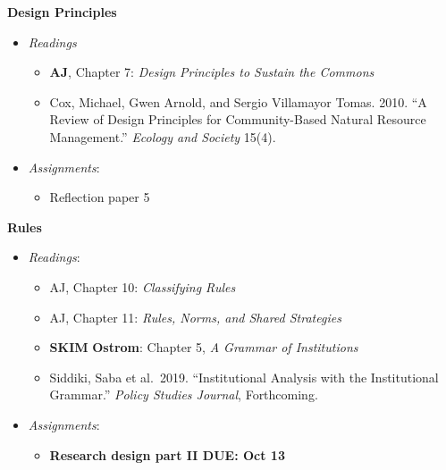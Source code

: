 \week \textbf{Design Principles}

\begin{itemize}

\item
  \emph{Readings}

  \begin{itemize}
  
  \item
    \textbf{AJ}, Chapter 7: \emph{Design Principles to Sustain the
    Commons}
  \item
    Cox, Michael, Gwen Arnold, and Sergio Villamayor Tomas. 2010. ``A
    Review of Design Principles for Community-Based Natural Resource
    Management.'' \emph{Ecology and Society} 15(4).
  \end{itemize}
\item
  \emph{Assignments}:

  \begin{itemize}
  
  \item
    Reflection paper 5
  \end{itemize}
\end{itemize}

\week \textbf{Rules}

\begin{itemize}

\item
  \emph{Readings}:

  \begin{itemize}
  
  \item
    AJ, Chapter 10: \emph{Classifying Rules}
  \item
    AJ, Chapter 11: \emph{Rules, Norms, and Shared Strategies}
  \item
    \textbf{SKIM} \textbf{Ostrom}: Chapter 5, \emph{A Grammar of
    Institutions}
  \item
    Siddiki, Saba et al.~2019. ``Institutional Analysis with the
    Institutional Grammar.'' \emph{Policy Studies Journal}, Forthcoming.
  \end{itemize}
\item
  \emph{Assignments}:

  \begin{itemize}
  
  \item
    \textbf{Research design part II DUE: Oct 13}
  \end{itemize}
\end{itemize}

